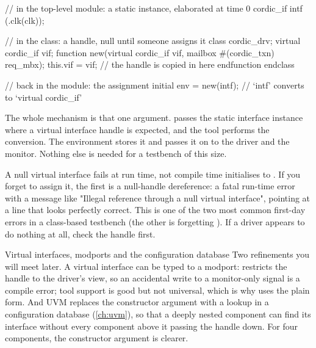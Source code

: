\begin{svcode}[caption={How the interface handle reaches the classes},label={lst:tb:vif}]
// in the top-level module: a static instance, elaborated at time 0
cordic_if intf (.clk(clk));

// in the class: a handle, null until someone assigns it
class cordic_drv;
  virtual cordic_if vif;
  function new(virtual cordic_if vif, mailbox #(cordic_txn) req_mbx);
    this.vif = vif;             // the handle is copied in here
  endfunction
endclass

// back in the module: the assignment
initial env = new(intf);        // `intf' converts to `virtual cordic_if'
\end{svcode}

The whole mechanism is that one argument.  passes the static
interface instance where a virtual interface handle is expected, and the tool
performs the conversion. The environment stores it and passes it on to the
driver and the monitor. Nothing else is needed for a testbench of this size.

\begin{gotcha}{A null virtual interface fails at run time, not compile time}
 initialises to . If you forget to
assign it, the first  is a null-handle
dereference: a fatal run-time error with a message like "Illegal reference
through a null virtual interface", pointing at a line that looks perfectly
correct. This is one of the two most common first-day errors in a class-based
testbench (the other is forgetting ). If a driver appears to
do nothing at all, check the handle first.
\end{gotcha}

\begin{notebox}{Virtual interfaces, modports and the configuration database}
Two refinements you will meet later. A virtual interface can be typed to a
modport:  restricts the handle to the
driver's view, so an accidental write to a monitor-only signal is a compile
error; tool support is good but not universal, which is why
 uses the plain form. And UVM replaces the constructor argument with a lookup in a configuration
database (\cref{ch:uvm}), so that a deeply nested component can find its
interface without every component above it passing the handle down. For four
components, the constructor argument is clearer.
\end{notebox}

